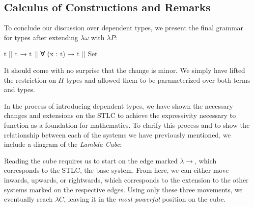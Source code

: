 \documentclass[12pt]{article}
\begin{document}
\subsection*{Calculus of Constructions and Remarks}
To conclude our discussion over dependent types, we present the final grammar for
types after extending \(\lambda\omega\) with \(\lambda P\):
\begin{center}
\begin{minipage}{0.5\textwidth}
\begin{code}
t || t → t || ∀ (x : t) → t || Set
\end{code}
\end{minipage}
\end{center}
It should come with no surprise that the change is minor. We simply have lifted
the restriction on \(\Pi\)-types and allowed them to be parameterized over both
terms and types.

In the process of introducing dependent types, we have shown the necessary
changes and extensions on the STLC to achieve the expressivity necessary to
function as a foundation for mathematics. To clarify this process and to show
the relationship between each of the systems we have previously mentioned, we
include a diagram of the {\em Lambda Cube}:
\begin{center}
\end{center}
Reading the cube requires us to start on the edge marked \(\lambda\rightarrow\),
which corresponds to the STLC, the base system. From here, we can either move
inwards, upwards, or rightwards, which corresponds to the extension to the
other systems marked on the respective edges. Using only these three movements,
we eventually reach \(\lambda C\), leaving it in the {\em most powerful}
position on the cube.
\end{document}
